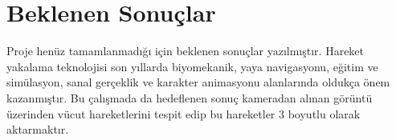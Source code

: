 \documentclass[12pt, a4paper]{article}
\begin{document}
\section{Beklenen Sonuçlar}
Proje henüz tamamlanmadığı için beklenen sonuçlar yazılmıştır.
Hareket yakalama teknolojisi son yıllarda biyomekanik, yaya
navigasyonu, eğitim ve simülasyon, sanal gerçeklik ve
karakter animasyonu alanlarında oldukça önem kazanmıştır.
Bu çalışmada da hedeflenen sonuç kameradan alınan görüntü üzerinden vücut hareketlerini tespit edip bu hareketler 3 boyutlu olarak aktarmaktır.


\end{document}
